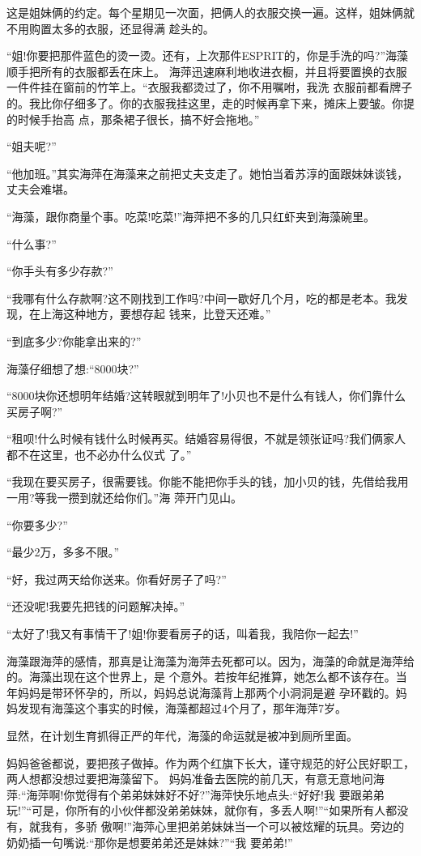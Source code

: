 \documentclass[11pt,a4paper,onecolumn]{article}
\begin{document}
这是姐妹俩的约定。每个星期见一次面，把俩人的衣服交换一遍。这样，姐妹俩就不用购置太多的衣服，还显得满
趁头的。

``姐!你要把那件蓝色的烫一烫。还有，上次那件ESPRIT的，你是手洗的吗?''海藻顺手把所有的衣服都丢在床上。
海萍迅速麻利地收进衣橱，并且将要置换的衣服一件件挂在窗前的竹竿上。``衣服我都烫过了，你不用嘱咐，我洗
衣服前都看牌子的。我比你仔细多了。你的衣服我挂这里，走的时候再拿下来，摊床上要皱。你提的时候手抬高
点，那条裙子很长，搞不好会拖地。''

``姐夫呢?''

``他加班。''其实海萍在海藻来之前把丈夫支走了。她怕当着苏淳的面跟妹妹谈钱，丈夫会难堪。

``海藻，跟你商量个事。吃菜!吃菜!''海萍把不多的几只红虾夹到海藻碗里。

``什么事?''

``你手头有多少存款?''

``我哪有什么存款啊?这不刚找到工作吗?中间一歇好几个月，吃的都是老本。我发现，在上海这种地方，要想存起
钱来，比登天还难。''

``到底多少?你能拿出来的?''

海藻仔细想了想:``8000块?''

``8000块你还想明年结婚?这转眼就到明年了!小贝也不是什么有钱人，你们靠什么买房子啊?''

``租呗!什么时候有钱什么时候再买。结婚容易得很，不就是领张证吗?我们俩家人都不在这里，也不必办什么仪式
了。''

``我现在要买房子，很需要钱。你能不能把你手头的钱，加小贝的钱，先借给我用一用?等我一攒到就还给你们。''海
萍开门见山。

``你要多少?''

``最少2万，多多不限。''

``好，我过两天给你送来。你看好房子了吗?''

``还没呢!我要先把钱的问题解决掉。''

``太好了!我又有事情干了!姐!你要看房子的话，叫着我，我陪你一起去!''

海藻跟海萍的感情，那真是让海藻为海萍去死都可以。因为，海藻的命就是海萍给的。海藻出现在这个世界上，是
个意外。若按年纪推算，她怎么都不该存在。当年妈妈是带环怀孕的，所以，妈妈总说海藻背上那两个小洞洞是避
孕环戳的。妈妈发现有海藻这个事实的时候，海藻都超过4个月了，那年海萍7岁。

显然，在计划生育抓得正严的年代，海藻的命运就是被冲到厕所里面。

妈妈爸爸都说，要把孩子做掉。作为两个红旗下长大，谨守规范的好公民好职工，两人想都没想过要把海藻留下。
妈妈准备去医院的前几天，有意无意地问海萍:``海萍啊!你觉得有个弟弟妹妹好不好?''海萍快乐地点头:``好好!我
要跟弟弟玩!''``可是，你所有的小伙伴都没弟弟妹妹，就你有，多丢人啊!''``如果所有人都没有，就我有，多骄
傲啊!''海萍心里把弟弟妹妹当一个可以被炫耀的玩具。旁边的奶奶插一句嘴说:``那你是想要弟弟还是妹妹?''``我
要弟弟!''
\end{document}
